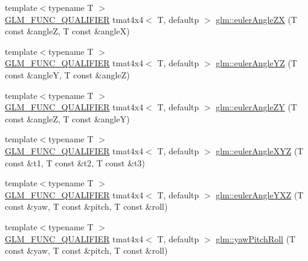 \begin{DoxyCompactItemize}
\item 
{\footnotesize template$<$typename T $>$ }\\\mbox{\hyperlink{setup_8hpp_a33fdea6f91c5f834105f7415e2a64407}{G\+L\+M\+\_\+\+F\+U\+N\+C\+\_\+\+Q\+U\+A\+L\+I\+F\+I\+ER}} tmat4x4$<$ T, defaultp $>$ \mbox{\hyperlink{group__gtx__euler__angles_gaef83cf40bd9ae780011b29970f16f622}{glm\+::euler\+Angle\+ZX}} (T const \&angleZ, T const \&angleX)
\item 
{\footnotesize template$<$typename T $>$ }\\\mbox{\hyperlink{setup_8hpp_a33fdea6f91c5f834105f7415e2a64407}{G\+L\+M\+\_\+\+F\+U\+N\+C\+\_\+\+Q\+U\+A\+L\+I\+F\+I\+ER}} tmat4x4$<$ T, defaultp $>$ \mbox{\hyperlink{group__gtx__euler__angles_ga1033f84f51d61646145352ef0c1bb58c}{glm\+::euler\+Angle\+YZ}} (T const \&angleY, T const \&angleZ)
\item 
{\footnotesize template$<$typename T $>$ }\\\mbox{\hyperlink{setup_8hpp_a33fdea6f91c5f834105f7415e2a64407}{G\+L\+M\+\_\+\+F\+U\+N\+C\+\_\+\+Q\+U\+A\+L\+I\+F\+I\+ER}} tmat4x4$<$ T, defaultp $>$ \mbox{\hyperlink{group__gtx__euler__angles_ga02f037926568bbd12dfece3b28b20343}{glm\+::euler\+Angle\+ZY}} (T const \&angleZ, T const \&angleY)
\item 
{\footnotesize template$<$typename T $>$ }\\\mbox{\hyperlink{setup_8hpp_a33fdea6f91c5f834105f7415e2a64407}{G\+L\+M\+\_\+\+F\+U\+N\+C\+\_\+\+Q\+U\+A\+L\+I\+F\+I\+ER}} tmat4x4$<$ T, defaultp $>$ \mbox{\hyperlink{group__gtx__euler__angles_gaaedda1657a1aebe0a904d864b33844e8}{glm\+::euler\+Angle\+X\+YZ}} (T const \&t1, T const \&t2, T const \&t3)
\item 
{\footnotesize template$<$typename T $>$ }\\\mbox{\hyperlink{setup_8hpp_a33fdea6f91c5f834105f7415e2a64407}{G\+L\+M\+\_\+\+F\+U\+N\+C\+\_\+\+Q\+U\+A\+L\+I\+F\+I\+ER}} tmat4x4$<$ T, defaultp $>$ \mbox{\hyperlink{group__gtx__euler__angles_ga0242b5ab68651db70c6025815549427f}{glm\+::euler\+Angle\+Y\+XZ}} (T const \&yaw, T const \&pitch, T const \&roll)
\item 
{\footnotesize template$<$typename T $>$ }\\\mbox{\hyperlink{setup_8hpp_a33fdea6f91c5f834105f7415e2a64407}{G\+L\+M\+\_\+\+F\+U\+N\+C\+\_\+\+Q\+U\+A\+L\+I\+F\+I\+ER}} tmat4x4$<$ T, defaultp $>$ \mbox{\hyperlink{group__gtx__euler__angles_gaf9c8d0f1df88c5344165600774489bc5}{glm\+::yaw\+Pitch\+Roll}} (T const \&yaw, T const \&pitch, T const \&roll)
\item 

\end{DoxyCompactItemize}
